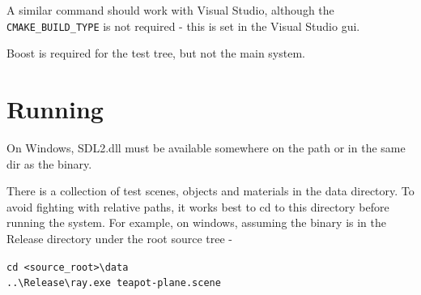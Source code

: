 A similar command should work with Visual Studio, although the \verb|CMAKE_BUILD_TYPE| is not required - this is set in the Visual Studio gui.


Boost is required for the test tree, but not the main system.

\section{Running}

On Windows, SDL2.dll must be available somewhere on the path or in the same dir as the binary. 

There is a collection of test scenes, objects and materials in the data directory. To avoid fighting with relative paths, it works best to cd to this directory before running the system. For example, on windows, assuming the binary is in the Release directory under the root source tree - 

\verb|cd <source_root>\data| \\
\verb|..\Release\ray.exe teapot-plane.scene|

